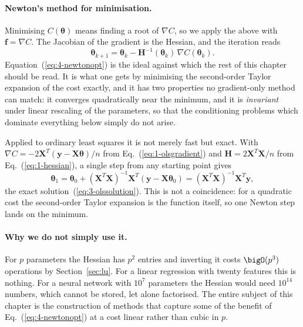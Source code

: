 \paragraph{Newton's method for minimisation.}
Minimising $C(\bm{\theta})$ means finding a root of $\nabla C$, so we apply the
above with $\bm{f}=\nabla C$.  The Jacobian of the gradient is the Hessian,
and the iteration reads
\begin{equation}
  \boxed{\;
  \bm{\theta}_{k+1} = \bm{\theta}_k
    - \bm{H}^{-1}(\bm{\theta}_k)\,\nabla C(\bm{\theta}_k) . \;}
  \label{eq:4-newtonopt}
\end{equation}
Equation~(\ref{eq:4-newtonopt}) is the ideal against which the rest of this
chapter should be read.  It is what one gets by minimising the second-order
Taylor expansion of the cost exactly, and it has two properties no
gradient-only method can match: it converges quadratically near the minimum,
and it is \emph{invariant} under linear rescaling of the parameters, so that
the conditioning problems which dominate everything below simply do not arise.

Applied to ordinary least squares it is not merely fast but exact.  With
$\nabla C=-2\bm{X}^{T}(\bm{y}-\bm{X}\bm{\theta})/n$ from
Eq.~(\ref{eq:1-olsgradient}) and $\bm{H}=2\bm{X}^{T}\bm{X}/n$ from
Eq.~(\ref{eq:1-hessian}), a single step from any starting point gives
\begin{equation}
  \bm{\theta}_{1} = \bm{\theta}_0
    + \left(\bm{X}^{T}\bm{X}\right)^{-1}\bm{X}^{T}
      \left(\bm{y}-\bm{X}\bm{\theta}_0\right)
    = \left(\bm{X}^{T}\bm{X}\right)^{-1}\bm{X}^{T}\bm{y},
  \label{eq:4-newtonols}
\end{equation}
the exact solution~(\ref{eq:3-olssolution}).  This is not a coincidence: for a
quadratic cost the second-order Taylor expansion is the function itself, so
one Newton step lands on the minimum.

\paragraph{Why we do not simply use it.}
For $p$ parameters the Hessian has $p^{2}$ entries and inverting it costs
$\bigO(p^{3})$ operations by Section~\ref{sec:lu}.  For a linear regression
with twenty features this is nothing.  For a neural network with $10^{7}$
parameters the Hessian would need $10^{14}$ numbers, which cannot be stored,
let alone factorised.  The entire subject of this chapter is the construction
of methods that capture some of the benefit of Eq.~(\ref{eq:4-newtonopt}) at a
cost linear rather than cubic in $p$.

